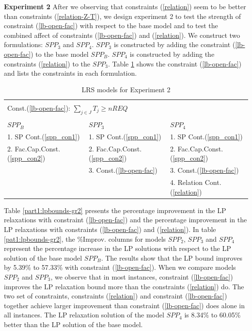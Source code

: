 {\bf Experiment 2} After we observing that constraints (\ref{relation}) seem to be better than constraints 
(\ref{relation-Z-T}), we design experiment 2 to test the strength of constraint (\ref{lb-open-fac}) 
with respect to the base model and to test the combined affect of constraints (\ref{lb-open-fac}) and (\ref{relation}).
We construct two formulations: $SPP_3$ and $SPP_4$. $SPP_3$ is constructed
by adding the constraint (\ref{lb-open-fac}) to the base model $SPP_B$. 
$SPP_4$ is constructed by adding the constraints (\ref{relation}) to the $SPP_3$.
Table \ref{part1:formulations-gr2} shows the constraint (\ref{lb-open-fac}) and lists the constraints in each formulation.   

\begin{table}[h]
\centering
\caption{LRS models for Experiment 2}\label{part1:formulations-gr2}
\begin {tabular}[t]{|l|l|l|}  
\multicolumn{3}{l}{\mbox{}}\\
\multicolumn{3}{l}{Const.(\ref{lb-open-fac}): $\sum_{j \in J} T_{j} \geq nREQ$ }\\
\multicolumn{3}{l}{\mbox{}}\\
\hline
$SPP_B$ & $SPP_3$ & $SPP_4$ \\\hline
1. SP Cont.(\ref{spp_con1}) & 1. SP Cont.(\ref{spp_con1}) & 1. SP Cont.(\ref{spp_con1}) \\
2. Fac.Cap.Const.(\ref{spp_con2}) & 2. Fac.Cap.Const.(\ref{spp_con2}) & 2. Fac.Cap.Const.(\ref{spp_con2}) \\
\mbox{} & 3. Const.(\ref{lb-open-fac})  & 3. Const.(\ref{lb-open-fac}) \\
\mbox{} & \mbox{}  & 4. Relation Cont.(\ref{relation})\\\hline
\end{tabular}
\end{table}

Table \ref{part1:lpbounds-gr2} presents the percentage improvement in the LP relaxations with
constraint (\ref{lb-open-fac}) and the percentage improvement in the LP relaxations with
constraints (\ref{lb-open-fac}) and (\ref{relation}). In table \ref{pat1:lpbounds-gr2}, the \%Improv. 
columns for models $SPP_2$, $SPP_3$ and $SPP_4$ represent the percentage increase
in the LP solutions with respect to the LP solution of the base model $SPP_B$. 
The results show that the LP bound improves by 5.39\% to 57.33\% with constraint 
(\ref{lb-open-fac}). When we compare models $SPP_2$ and $SPP_3$, we observe that
in most instances, constraint (\ref{lb-open-fac}) improves the LP relaxation bound 
more than the constraints (\ref{relation}) do. The two set of constraints, 
constraints (\ref{relation}) and
constraint (\ref{lb-open-fac}) together achieve larger improvement than 
constraint (\ref{lb-open-fac}) does alone in all instances. The LP relaxation
solution of the model $SPP_4$ is 8.34\% to 60.05\% better than the LP
solution of the base model. 

